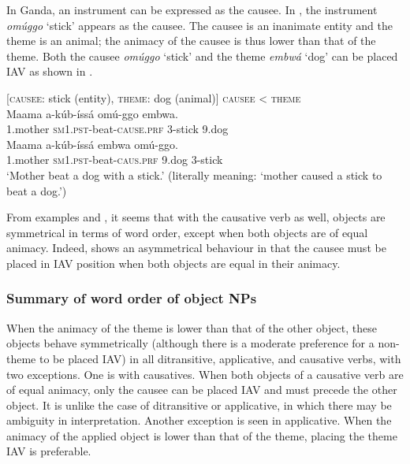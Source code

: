 \documentclass[output=paper,
            colorlinks, citecolor=brown
            ,draftmode
		  ]{langscibook}
\begin{document}
              



    In Ganda, an instrument can be expressed as the causee. In , the instrument \textit{omúggo} ‘stick’ appears as the causee. The causee is an inanimate entity and the theme is an animal; the animacy of the causee is thus lower than that of the theme. Both the causee \textit{omúggo} ‘stick’ and the theme \textit{embwá} ‘dog’ can be placed IAV as shown in . 

\ea%
    \label{ex:yoneda:17}
    [\textsc{causee}: stick (entity), \textsc{theme}: dog (animal)]  \textsc{causee} < \textsc{theme}\\
    \ea\label{ex:yoneda:17a}\gll Maama    a-kúb-íssá                   omú-ggo    embwa.\\
         1.mother   \textsc{sm1.pst}-beat-\textsc{cause.prf}    3-stick      9.dog \\
    \ex\label{ex:yoneda:17b}\gll Maama    a-kúb-íssá                   embwa   omú-ggo.\\
    1.mother   \textsc{sm1.pst}-beat-\textsc{caus.prf}    9.dog     3-stick\\
    \glt ‘Mother beat a dog with a stick.'
        (literally meaning: ‘mother caused a stick to beat a dog.’)
    \z
\z
        

From examples  and , it seems that with the causative verb as well, objects are symmetrical in terms of word order, except when both objects are of equal animacy. Indeed,  shows an asymmetrical behaviour in that the causee must be placed in IAV position when both objects are equal in their animacy.  

\subsubsection{Summary of word order of object NPs} \label{sec:yoneda:3.1.4}

When the animacy of the theme is lower than that of the other object, these objects behave symmetrically (although there is a moderate preference for a non-theme to be placed IAV) in all ditransitive, applicative, and causative verbs, with two exceptions. One is with causatives. When both objects of a causative verb are of equal animacy, only the causee can be placed IAV and must precede the other object. It is unlike the case of ditransitive or applicative, in which there may be ambiguity in interpretation. Another exception is seen in applicative. When the animacy of the applied object is lower than that of the theme, placing the theme IAV is preferable. 
\end{document}
